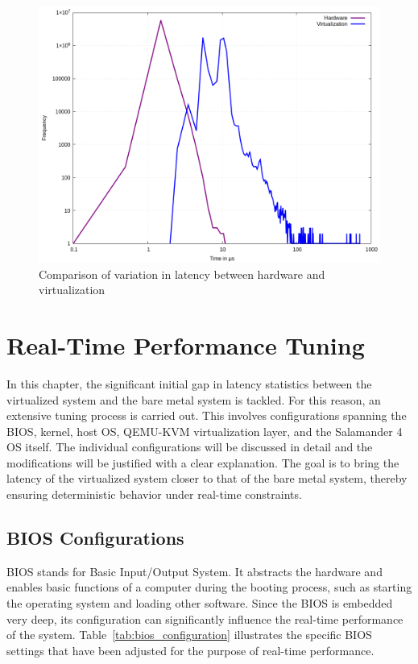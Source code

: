 \documentclass[MMR,Master,english]{twbook}
\begin{document}
\begin{figure}[H]
	\centering
	\includegraphics[width=0.7\columnwidth]{masterthesis-documentation/docs/sigmatek/xenomai/01combined/gnuplot_combined_max_latency.png}
	\caption[Comparison of variation in latency between hardware and virtualization]{Comparison of variation in latency between hardware and virtualization}
	\label{fig:gnuplot_max_latency_combined}
\end{figure}



\clearpage

\chapter{Real-Time Performance Tuning}\label{cha:real-time_tuning}

In this chapter, the significant initial gap in latency statistics between the virtualized system and the bare metal system is tackled. For this reason, an extensive tuning process is carried out. This involves configurations spanning the BIOS, kernel, host OS, QEMU-KVM virtualization layer, and the Salamander 4 OS itself. The individual configurations will be discussed in detail and the modifications will be justified with a clear explanation. The goal is to bring the latency of the virtualized system closer to that of the bare metal system, thereby ensuring deterministic behavior under real-time constraints.

\section{BIOS Configurations}\label{sec:bios_configurations}

BIOS stands for Basic Input/Output System. It abstracts the hardware and enables basic functions of a computer during the booting process, such as starting the operating system and loading other software. Since the BIOS is embedded very deep, its configuration can significantly influence the real-time performance of the system. Table~\ref{tab:bios_configuration} illustrates the specific BIOS settings that have been adjusted for the purpose of real-time performance. 
\end{document}
